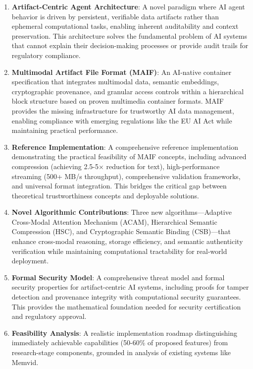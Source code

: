 \documentclass[conference]{IEEEtran}
\begin{document}
\begin{enumerate}[leftmargin=*]
\item \textbf{Artifact-Centric Agent Architecture}: A novel paradigm where AI agent behavior is driven by persistent, verifiable data artifacts rather than ephemeral computational tasks, enabling inherent auditability and context preservation. This architecture solves the fundamental problem of AI systems that cannot explain their decision-making processes or provide audit trails for regulatory compliance.

\item \textbf{Multimodal Artifact File Format (MAIF)}: An AI-native container specification that integrates multimodal data, semantic embeddings, cryptographic provenance, and granular access controls within a hierarchical block structure based on proven multimedia container formats. MAIF provides the missing infrastructure for trustworthy AI data management, enabling compliance with emerging regulations like the EU AI Act while maintaining practical performance.

\item \textbf{Reference Implementation}: A comprehensive reference implementation demonstrating the practical feasibility of MAIF concepts, including advanced compression (achieving 2.5-5× reduction for text), high-performance streaming (500+ MB/s throughput), comprehensive validation frameworks, and universal format integration. This bridges the critical gap between theoretical trustworthiness concepts and deployable solutions.

\item \textbf{Novel Algorithmic Contributions}: Three new algorithms—Adaptive Cross-Modal Attention Mechanism (ACAM), Hierarchical Semantic Compression (HSC), and Cryptographic Semantic Binding (CSB)—that enhance cross-modal reasoning, storage efficiency, and semantic authenticity verification while maintaining computational tractability for real-world deployment.

\item \textbf{Formal Security Model}: A comprehensive threat model and formal security properties for artifact-centric AI systems, including proofs for tamper detection and provenance integrity with computational security guarantees. This provides the mathematical foundation needed for security certification and regulatory approval.

\item \textbf{Feasibility Analysis}: A realistic implementation roadmap distinguishing immediately achievable capabilities (50-60\% of proposed features) from research-stage components, grounded in analysis of existing systems like Memvid.
\end{enumerate}
\end{document}
